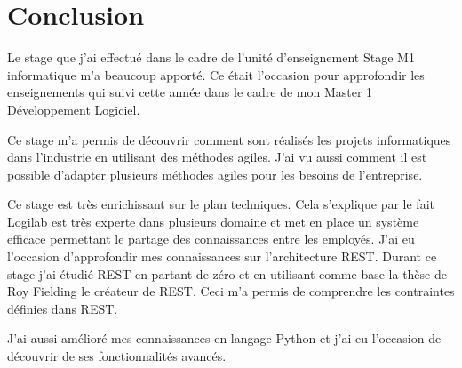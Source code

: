 \chapter*{Conclusion}
Le stage que j’ai effectué dans le cadre de l’unité d’enseignement Stage M1
informatique m’a beaucoup apporté. Ce était l'occasion pour approfondir les
enseignements qui suivi cette année dans le cadre de mon Master 1 Développement
Logiciel.

Ce stage m'a permis de découvrir comment sont réalisés les projets informatiques
dans l'industrie en utilisant des méthodes agiles. J'ai vu aussi comment il est
possible d'adapter plusieurs méthodes agiles pour les besoins de l'entreprise.

Ce stage est très enrichissant sur le plan techniques. Cela s'explique par le
fait Logilab est très experte dans plusieurs domaine et met en place un système
efficace permettant le partage des connaissances entre les employés. J'ai eu
l'occasion d'approfondir mes connaissances sur l'architecture REST. Durant ce
stage j'ai étudié REST en partant de zéro et en utilisant comme base la thèse de
Roy Fielding le créateur de REST. Ceci m'a permis de comprendre les contraintes
définies dans REST. 

J'ai aussi amélioré mes connaissances en langage Python et j'ai eu l'occasion de
découvrir de ses fonctionnalités avancés.  

